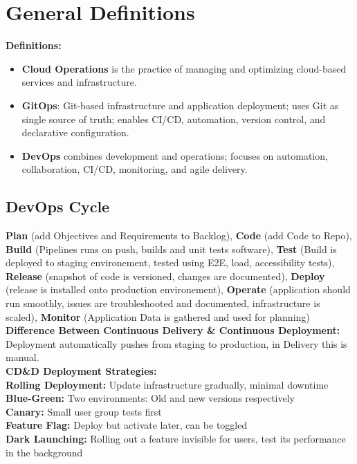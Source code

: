 \section{General Definitions}
\textbf{Definitions:}
\begin{itemize}

	\item \textbf{Cloud Operations} is the practice of managing and optimizing cloud-based services and infrastructure.
	\item \textbf{GitOps}: Git-based infrastructure and application deployment; uses Git as single source of truth; enables CI/CD, automation, version control, and declarative configuration.

	\item \textbf{DevOps} combines development and operations; focuses on automation, collaboration, CI/CD, monitoring, and agile delivery.
\end{itemize}
\subsection{DevOps Cycle}
\textbf{Plan} (add Objectives and Requirements to Backlog), \textbf{Code} (add Code to Repo), \textbf{Build} (Pipelines runs on push, builds and unit tests software), \textbf{Test} (Build is deployed to staging environement, tested using E2E, load, accessibility tests), \textbf{Release} (snapshot of code is versioned, changes are documented), \textbf{Deploy} (release is installed onto production environement), \textbf{Operate} (application should run smoothly, issues are troubleshooted and documented, infrastructure is scaled), \textbf{Monitor} (Application Data is gathered and used for planning)
\textbf{Difference Between Continuous Delivery \& Continuous Deployment:} Deployment automatically pushes from staging to production, in Delivery this is manual. \\
\textbf{CD\&D Deployment Strategies:} \\
\textbf{Rolling Deployment:} Update infrastructure gradually, minimal downtime \\
\textbf{Blue-Green:} Two environments: Old and new versions respectively \\
\textbf{Canary:} Small user group tests first \\
\textbf{Feature Flag:} Deploy but activate later, can be toggled \\
\textbf{Dark Launching:} Rolling out a feature invisible for users, test its performance in the background
